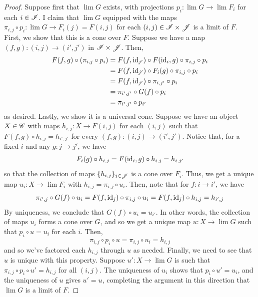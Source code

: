 \documentclass[12pt]{exam}
\begin{document}
\begin{proof}
	Suppose first that $\lim G$ exists, with projections $p_i : \lim G \to \lim F_i$ for each $i \in \mathscr{I}$. I claim that $\lim G$ equipped with the maps $\pi_{i,j} \circ p_i : \lim G \to F_i(j) = F(i,j)$ for each $(i,j) \in \mathscr{I} \times \mathscr{J}$ is a limit of $F$. First, we show that this is a cone over $F$. Suppose we have a map $(f,g) : (i,j) \to (i',j')$ in $\mathscr{I} \times \mathscr{J}$. Then,
	\begin{align*}
	F(f,g) \circ (\pi_{i,j} \circ p_i)
		&= F(f,\operatorname{id}_{j'}) \circ F(\operatorname{id}_i,g) \circ \pi_{i,j} \circ p_i \\
		&= F(f,\operatorname{id}_{j'}) \circ F_i(g) \circ \pi_{i,j} \circ p_i \\
		&= F(f,\operatorname{id}_{j'}) \circ \pi_{i,j'} \circ p_i \\
		&= \pi_{i',j'} \circ G(f) \circ p_i \\
		&= \pi_{i',j'} \circ p_{i'}
	\end{align*}
	as desired. Lastly, we show it is a universal cone. Suppose we have an object $X \in \mathscr{C}$ with maps $h_{i,j} : X \to F(i,j)$ for each $(i,j)$ such that $F(f,g) \circ h_{i,j} = h_{i',j'}$ for every $(f,g) : (i,j) \to (i',j')$. Notice that, for a fixed $i$ and any $g : j \to j'$, we have
	\[ F_i(g) \circ h_{i,j} = F(\operatorname{id}_i,g) \circ h_{i,j} = h_{i,j'} \]
	so that the collection of maps $\{h_{i,j}\}_{j \in \mathscr{J}}$ is a cone over $F_i$. Thus, we get a unique map $u_i : X \to \lim F_i$ with $h_{i,j} = \pi_{i,j} \circ u_i$. Then, note that for $f : i \to i'$, we have
	\[ \pi_{i',j} \circ G(f) \circ u_i = F(f,\operatorname{id}_j) \circ \pi_{i,j} \circ u_i = F(f,\operatorname{id}_j) \circ h_{i,j} = h_{i',j} \]
	By uniqueness, we conclude that $G(f) \circ u_i = u_{i'}$. In other words, the collection of maps $u_i$ forms a cone over $G$, and so we get a unique map $u : X \to \lim G$ such that $p_i \circ u = u_i$ for each $i$. Then,
	\[ \pi_{i,j} \circ p_i \circ u = \pi_{i,j} \circ u_i = h_{i,j} \]
	and so we've factored each $h_{i,j}$ through $u$ as needed. Finally, we need to see that $u$ is unique with this property. Suppose $u' : X \to \lim G$ is such that $\pi_{i,j} \circ p_i \circ u' = h_{i,j}$ for all $(i,j)$. The uniqueness of $u_i$ shows that $p_i \circ u' = u_i$, and the uniqueness of $u$ gives $u' = u$, completing the argument in this direction that $\lim G$ is a limit of $F$.
	

\end{proof}
\end{document}
